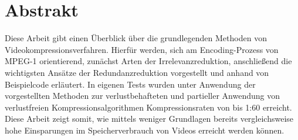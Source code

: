 \chapter{Abstrakt}
Diese Arbeit gibt einen Überblick über die grundlegenden Methoden von Videokompressionsverfahren. Hierfür werden, sich am Encoding-Prozess von MPEG-1 orientierend, zunächst Arten der Irrelevanzreduktion, anschließend die wichtigsten Ansätze der Redundanzreduktion vorgestellt und anhand von Beispielcode erläutert. In eigenen Tests wurden unter Anwendung der vorgestellten Methoden zur verlustbehafteten und partieller Anwendung von verlustfreien Kompressionsalgorithmen Kompressionsraten von bis 1:60 erreicht. Diese Arbeit zeigt somit, wie mittels weniger Grundlagen bereits vergleichsweise hohe Einsparungen im Speicherverbrauch von Videos erreicht werden können.
